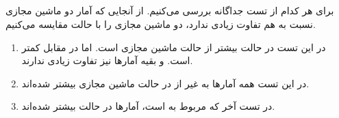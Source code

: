 \documentclass{article}
\begin{document}
\subsection{}
برای هر کدام از تست‌ جداگانه بررسی می‌کنیم. از آنجایی که آمار 
دو ماشین مجازی نسبت به هم تفاوت زیادی ندارد، دو ماشین مجازی 
را با حالت 
مقایسه می‌کنیم. 

\begin{enumerate}
  \item در این تست 
  در حالت 
  بیشتر از حالت ماشین مجازی است. اما در مقابل 
  کمتر است. و بقیه آمارها نیز تفاوت زیادی ندارند.
  \item در این تست همه آمارها به غیر از 
  در حالت ماشین مجازی بیشتر شده‌اند.
  \item در تست آخر که مربوط به 
  است، آمارها در حالت 
  بیشتر شده‌اند.
\end{enumerate}
\end{document}
